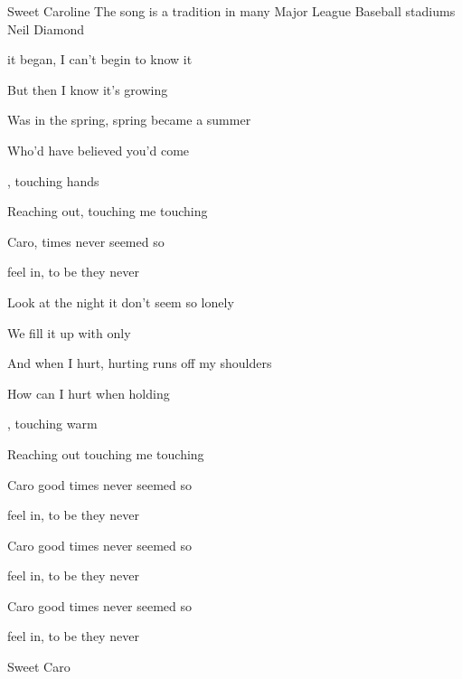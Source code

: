 \begin{SBSong}{Sweet Caroline}
  {The song is a tradition in many Major League Baseball stadiums}
  {Neil Diamond}
  \begin{SBVerse}
     it began, I can't begin to know it

    But then I know it's growing 

    Was in the spring,  spring became a summer

    Who'd have believed you'd come 
    
    , touching hands

    Reaching out, touching me touching 
  \end{SBVerse}
  \begin{SBChorus}
     Caro,  times never seemed so 

     feel in, to be they never 

      
  \end{SBChorus}
  \begin{SBVerse}
    Look at the night  it don't seem so lonely

    We fill it up with only 

    And when I hurt, hurting runs off my shoulders	

    How can I hurt when holding 

    , touching warm

    Reaching out touching me touching 
  \end{SBVerse}
  \begin{SBChorus}
     Caro good times never seemed so 

     feel in, to be they never 

        
  \end{SBChorus}
  \begin{SBChorus}
     Caro good times never seemed so 

     feel in, to be they never 
    
     Caro good times never seemed so 

     feel in, to be they never 
    
    Sweet Caro
  \end{SBChorus}
\end{SBSong}
